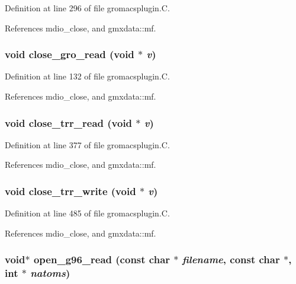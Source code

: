 Definition at line 296 of file gromacsplugin.C.

References mdio\_\-close, and gmxdata::mf.
\subsubsection{\setlength{\rightskip}{0pt plus 5cm}void close\_\-gro\_\-read (void $\ast$ {\em v})\hspace{0.3cm}{\tt  [static]}}\label{gromacsplugin_8C_a10}




Definition at line 132 of file gromacsplugin.C.

References mdio\_\-close, and gmxdata::mf.
\subsubsection{\setlength{\rightskip}{0pt plus 5cm}void close\_\-trr\_\-read (void $\ast$ {\em v})\hspace{0.3cm}{\tt  [static]}}\label{gromacsplugin_8C_a17}




Definition at line 377 of file gromacsplugin.C.

References mdio\_\-close, and gmxdata::mf.
\subsubsection{\setlength{\rightskip}{0pt plus 5cm}void close\_\-trr\_\-write (void $\ast$ {\em v})\hspace{0.3cm}{\tt  [static]}}\label{gromacsplugin_8C_a20}




Definition at line 485 of file gromacsplugin.C.

References mdio\_\-close, and gmxdata::mf.
\subsubsection{\setlength{\rightskip}{0pt plus 5cm}void$\ast$ open\_\-g96\_\-read (const char $\ast$ {\em filename}, const char $\ast$, int $\ast$ {\em natoms})\hspace{0.3cm}{\tt  [static]}}\label{gromacsplugin_8C_a11}




